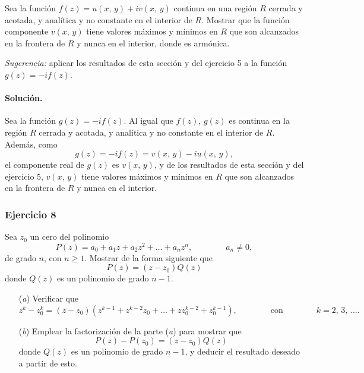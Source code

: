 \documentclass[a4paper]{report}
\begin{document}
Sea la función \(f(z)=u(x,\,y)+iv(x,\,y)\) continua en una región \(R\) cerrada y acotada, y analítica y no constante en el interior de \(R\). Mostrar que la función componente \(v(x,\,y)\) tiene valores máximos y mínimos en \(R\) que son alcanzados en la frontera de \(R\) y nunca en el interior, donde es armónica.

\emph{Sugerencia:} aplicar los resultados de esta sección y del ejercicio 5 a la función \(g(z)=-if(z)\). 

\paragraph{Solución.} Sea la función \(g(z)=-if(z)\). Al igual que \(f(z)\), \(g(z)\) es continua en la región \(R\) cerrada y acotada, y analítica y no constante en el interior de \(R\). Además, como
\[
 g(z)=-if(z)=v(x,\,y)-iu(x,\,y),
\]
el componente real de \(g(z)\) es \(v(x,\,y)\), y de los resultados de esta sección y del ejercicio 5, \(v(x,\,y)\) tiene valores máximos y mínimos en \(R\) que son alcanzados en la frontera de \(R\) y nunca en el interior.

\subsubsection{Ejercicio 8}

Sea \(z_0\) un cero del polinomio
\[
 P(z)=a_0+a_1z+a_2z^2+\dots+a_nz^n,
 \qquad\qquad
 a_n\neq0,
\]
de grado \(n\), con \(n\geq1\). Mostrar de la forma siguiente que 
\[
 P(z)=(z-z_0)Q(z)
\]
donde \(Q(z)\) es un polinomio de grado \(n-1\).
\begin{enumerate}
 \item[(\textit{a})] Verificar que 
 \[
  z^k-z_0^k=(z-z_0)(z^{k-1}+z^{k-2}z_0+\dots+zz_0^{k-2}+z_0^{k-1}),
  \qquad\qquad\textrm{con}\qquad\qquad
  k=2,\,3,\,\dots.
 \]
 \item[(\textit{b})] Emplear la factorización de la parte (\textit{a}) para mostrar que 
 \[
  P(z)-P(z_0)=(z-z_0)Q(z)
 \]
 donde \(Q(z)\) es un polinomio de grado \(n-1\), y deducir el resultado deseado a partir de esto.
\end{enumerate}
\end{document}

